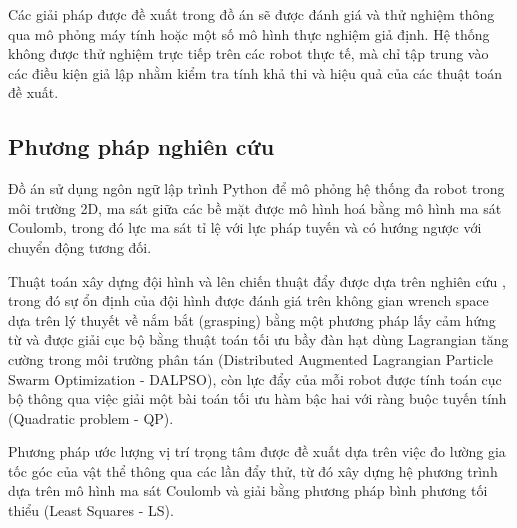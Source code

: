 Các giải pháp được đề xuất trong đồ án sẽ được đánh giá và thử nghiệm thông qua mô phỏng máy tính hoặc một số mô hình thực nghiệm giả định. Hệ thống không được thử nghiệm trực tiếp trên các robot thực tế, mà chỉ tập trung vào các điều kiện giả lập nhằm kiểm tra tính khả thi và hiệu quả của các thuật toán đề xuất.
    
\subsection{Phương pháp nghiên cứu}

Đồ án sử dụng ngôn ngữ lập trình Python để mô phỏng hệ thống đa robot trong môi trường 2D, ma sát giữa các bề mặt được mô hình hoá bằng mô hình ma sát Coulomb, trong đó lực ma sát tỉ lệ với lực pháp tuyến và có hướng ngược với chuyển động tương đối.

Thuật toán xây dựng đội hình và lên chiến thuật đẩy được dựa trên nghiên cứu \cite{Rosenfelder2024}, trong đó sự ổn định của đội hình được đánh giá trên không gian wrench space dựa trên lý thuyết về nắm bắt (grasping) bằng một phương pháp lấy cảm hứng từ \cite{ferrari1992planning} và được giải cục bộ bằng thuật toán tối ưu bầy đàn hạt dùng Lagrangian tăng cường trong môi trường phân tán (Distributed Augmented Lagrangian Particle Swarm Optimization - DALPSO), còn lực đẩy của mỗi robot được tính toán cục bộ thông qua việc giải một bài toán tối ưu hàm bậc hai với ràng buộc tuyến tính (Quadratic problem - QP).

Phương pháp ước lượng vị trí trọng tâm được đề xuất dựa trên việc đo lường gia tốc góc của vật thể thông qua các lần đẩy thử, từ đó xây dựng hệ phương trình dựa trên mô hình ma sát Coulomb và giải bằng phương pháp bình phương tối thiểu (Least Squares - LS).